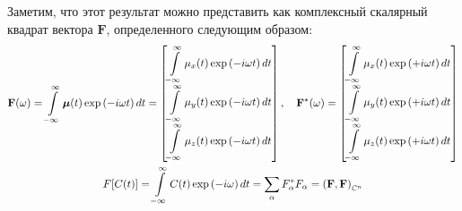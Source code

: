 \documentclass[12pt]{article}
\newcommand{\lb}{\left(}
\newcommand{\rb}{\right)}
\newcommand{\mf}{\mathbf}
\newcommand{\vverh}{\vspace*{-0.15cm}}
\newcommand{\intty}{\int\limits_{-\infty}^{\infty}}
\begin{document}
Заметим, что этот результат можно представить как комплексный скалярный квадрат вектора $\mf{F}$, определенного следующим образом:
\vverh
\begin{gather}
	\mf{F}(\omega) = \intty \boldsymbol{\mu}(t) \exp \lb - i \omega t \rb dt = 
\begin{bmatrix}
	{\displaystyle \intty \mu_x(t) \exp \lb - i \omega t \rb dt} \\
	{\displaystyle \intty \mu_y(t) \exp \lb - i \omega t \rb dt} \\
	{\displaystyle \intty \mu_z(t) \exp \lb - i \omega t \rb dt} 
\end{bmatrix}, \quad
\mf{F}^{*}(\omega) =
\begin{bmatrix}
	{\displaystyle \intty \mu_x(t) \exp \lb + i \omega t \rb dt} \\
	{\displaystyle \intty \mu_y(t) \exp \lb + i \omega t \rb dt} \\
	{\displaystyle \intty \mu_z(t) \exp \lb + i \omega t \rb dt}
\end{bmatrix} \notag \\
F[C(t)] = \intty C(t) \exp \lb - i \omega \rb dt = \sum_{\alpha} F_\alpha^{*} F_\alpha = \lb \mf{F}, \mf{F} \rb_{\mathbb{C}^n} \notag
\end{gather}
\end{document}
